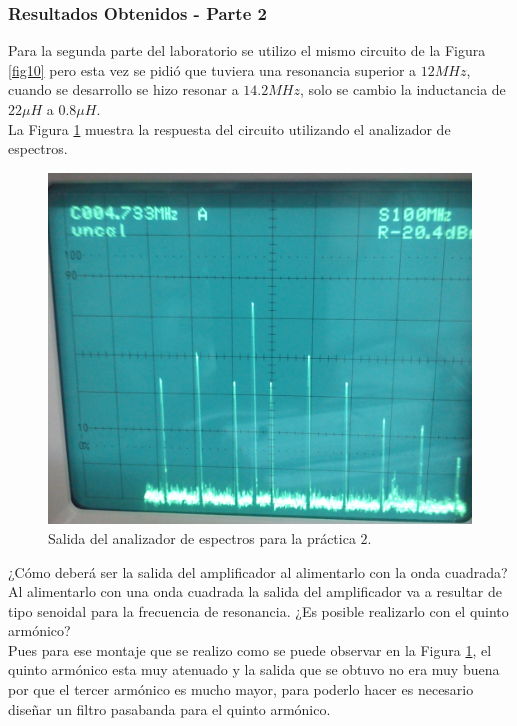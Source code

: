 \documentclass[11pt,graphicx,caption,rotating]{article}
\begin{document}
\subsubsection{Resultados Obtenidos - Parte 2}
\noindent
Para la segunda parte del laboratorio se utilizo el mismo circuito de la Figura \ref{fig10} pero esta vez se pidió que tuviera una resonancia superior a $12MHz$, cuando se desarrollo se hizo resonar a $14.2MHz$, solo se cambio la inductancia de $22\mu H$ a $0.8\mu H$.\\
La Figura \ref{fig11} muestra la respuesta del circuito utilizando el analizador de espectros.
\begin{figure}[H]
	\centering
		\includegraphics[scale=0.2]{thd.png}
	\caption{Salida del analizador de espectros para la práctica $2$.}
	\label{fig11}
\end{figure}
\noindent
¿Cómo deberá ser la salida del amplificador al alimentarlo con la onda cuadrada?\\
Al alimentarlo con una onda cuadrada la salida del amplificador va a resultar de tipo senoidal para la frecuencia de resonancia.
¿Es posible realizarlo con el quinto armónico?\\
Pues para ese montaje que se realizo como se puede observar en la Figura \ref{fig11}, el quinto armónico esta muy atenuado y la salida que se obtuvo no era muy buena por que el tercer armónico es mucho mayor, para poderlo hacer es necesario diseñar un filtro pasabanda para el quinto armónico.
\end{document}
